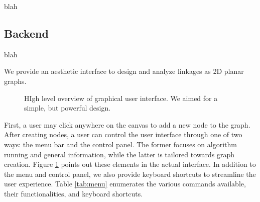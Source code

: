 \documentclass[aps,final,twocolumn,letterpaper,nofootinbib]{revtex4-1}
\begin{document}
blah
 
\subsection{Backend}
blah

We provide an aesthetic interface
to design and analyze linkages as 2D planar graphs.

\begin{figure}[ht]
\caption{HIgh level overview of graphical user interface.
We aimed for a simple, but powerful design.}
\label{fig:ui}
\end{figure}

First, a user may click anywhere on the canvas to add a new node to the graph.
After creating nodes,
a user can control the user interface through one of two ways:
the menu bar and the control panel.
The former focuses on algorithm running and general information,
while the latter is tailored towards graph creation.
Figure \ref{fig:ui} points out these elements in the actual interface.
In addition to the menu and control panel,
we also provide keyboard shortcuts to streamline the user experience.
Table \ref{tab:menu} enumerates the various commands available,
their functionalities, and keyboard shortcuts.
\end{document}
